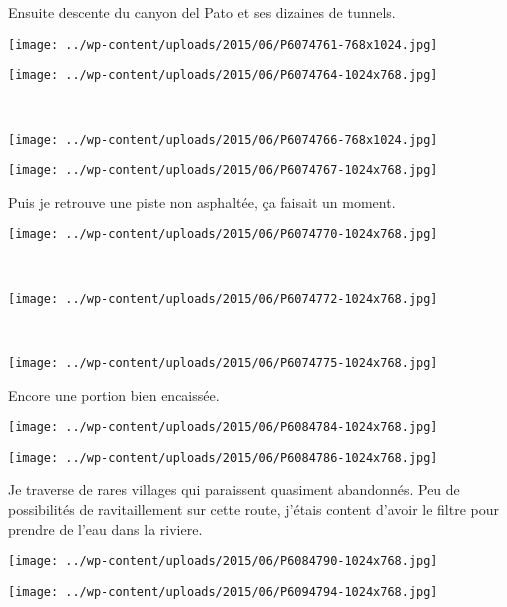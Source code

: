 Ensuite descente du canyon del Pato et ses dizaines de tunnels. 
\begin{center} \texttt{[image: ../wp-content/uploads/2015/06/P6074761-768x1024.jpg]} \end{center}
\begin{center} \texttt{[image: ../wp-content/uploads/2015/06/P6074764-1024x768.jpg]} \end{center}
\vspace{-\topsep}
\vspace{-1.25mm}
\pagebreak
~
\begin{center} \texttt{[image: ../wp-content/uploads/2015/06/P6074766-768x1024.jpg]} \end{center}
\begin{center} \texttt{[image: ../wp-content/uploads/2015/06/P6074767-1024x768.jpg]} \end{center}
\vspace{-\topsep}
\vspace{-1.25mm}
\pagebreak

Puis je retrouve une piste non asphaltée, ça faisait un moment. 
\begin{center} \texttt{[image: ../wp-content/uploads/2015/06/P6074770-1024x768.jpg]} \end{center}
~
\begin{center} \texttt{[image: ../wp-content/uploads/2015/06/P6074772-1024x768.jpg]} \end{center}
\vspace{-\topsep}
\pagebreak
~
\begin{center} \texttt{[image: ../wp-content/uploads/2015/06/P6074775-1024x768.jpg]} \end{center}

Encore une portion bien encaissée. 
\begin{center} \texttt{[image: ../wp-content/uploads/2015/06/P6084784-1024x768.jpg]} \end{center}
\begin{center} \texttt{[image: ../wp-content/uploads/2015/06/P6084786-1024x768.jpg]} \end{center}

Je traverse de rares villages qui paraissent quasiment abandonnés. Peu de possibilités de ravitaillement sur cette route, j'étais content d'avoir le filtre pour prendre de l'eau dans la riviere. 
\begin{center} \texttt{[image: ../wp-content/uploads/2015/06/P6084790-1024x768.jpg]} \end{center}
\begin{center} \texttt{[image: ../wp-content/uploads/2015/06/P6094794-1024x768.jpg]} \end{center}

